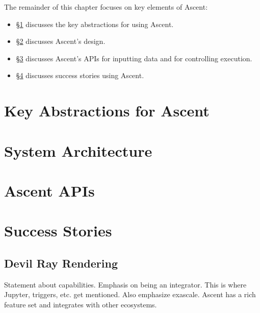 The remainder of this chapter focuses on key elements of Ascent:
\begin{itemize}
\item \S\ref{sec:capabilities} discusses the key abstractions for using Ascent.
\item \S\ref{sec:design} discusses Ascent's design.
\item \S\ref{sec:API} discusses Ascent's APIs for inputting
data and for controlling execution.
\item \S\ref{sec:success} discusses success stories using Ascent.
\end{itemize}

\section{Key Abstractions for Ascent}
\label{sec:capabilities}


\section{System Architecture}
\label{sec:design}


\section{Ascent APIs}
\label{sec:API}


\section{Success Stories}
\label{sec:success}


\subsection{Devil Ray Rendering}
\label{sec:DevilRay}




Statement about capabilities.  Emphasis on being an integrator.
This is where Jupyter, triggers, etc. get mentioned.  Also emphasize
exascale.
Ascent has a rich feature set and integrates with other ecosystems.

